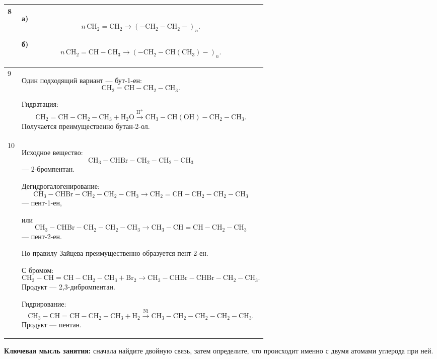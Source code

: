 \documentclass[a4paper,12pt]{article}
\begin{document}
\begin{longtable}{@{}p{0.8cm}p{13.8cm}@{}}
\midrule

8 &
а)
\[
n\,\mathrm{CH_2=CH_2}
\rightarrow
\left(\mathrm{-CH_2-CH_2-}\right)_n.
\]

б)
\[
n\,\mathrm{CH_2=CH-CH_3}
\rightarrow
\left(\mathrm{-CH_2-CH(CH_3)-}\right)_n.
\]
\\

\midrule

9 &
Один подходящий вариант --- бут-1-ен:
\[
\mathrm{CH_2=CH-CH_2-CH_3}.
\]

Гидратация:
\[
\mathrm{CH_2=CH-CH_2-CH_3+H_2O}
\xrightarrow{\mathrm{H^+}}
\mathrm{CH_3-CH(OH)-CH_2-CH_3}.
\]
Получается преимущественно бутан-2-ол.
\\

\midrule

10 &
Исходное вещество:
\[
\boxed{\mathrm{CH_3-CHBr-CH_2-CH_2-CH_3}}
\]
--- 2-бромпентан.

Дегидрогалогенирование:
\[
\mathrm{CH_3-CHBr-CH_2-CH_2-CH_3}
\rightarrow
\mathrm{CH_2=CH-CH_2-CH_2-CH_3}
\]
--- пент-1-ен,

или
\[
\mathrm{CH_3-CHBr-CH_2-CH_2-CH_3}
\rightarrow
\mathrm{CH_3-CH=CH-CH_2-CH_3}
\]
--- пент-2-ен.

По правилу Зайцева преимущественно образуется пент-2-ен.

С бромом:
\[
\mathrm{CH_3-CH=CH-CH_2-CH_3+Br_2}
\rightarrow
\mathrm{CH_3-CHBr-CHBr-CH_2-CH_3}.
\]
Продукт --- 2,3-дибромпентан.

Гидрирование:
\[
\mathrm{CH_3-CH=CH-CH_2-CH_3+H_2}
\xrightarrow{\mathrm{Ni}}
\mathrm{CH_3-CH_2-CH_2-CH_2-CH_3}.
\]
Продукт --- пентан.
\\

\bottomrule
\end{longtable}

\vfill

\begin{center}
\textcolor{darkaccent}{
\textbf{Ключевая мысль занятия:}
сначала найдите двойную связь, затем определите,
что происходит именно с двумя атомами углерода при ней.
}
\end{center}
\end{document}
